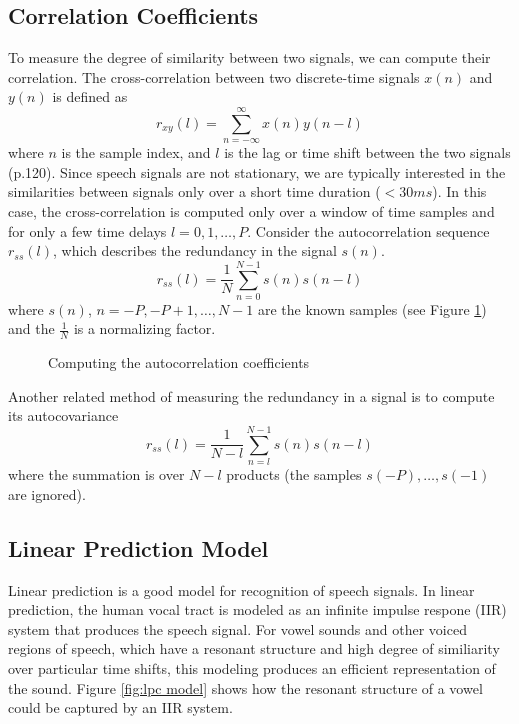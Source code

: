 %
%
%
%

\subsection{Correlation Coefficients}
To measure the degree of similarity between two signals, we can
compute their correlation.  The cross-correlation between two
discrete-time signals $x(n)$ and $y(n)$ is defined as
\begin{equation}
      r_{xy}(l) = \sum_{n=-\infty}^{\infty}x(n)y(n-l)
\end{equation}
where $n$ is the sample index, and $l$ is the lag or time
shift between the two signals \cite{Proakis} (p.120).  Since 
speech signals are not stationary, we are typically interested 
in the similarities between signals only over a short time 
duration ($<30ms$).  In this case, the cross-correlation 
is computed only over a window of time samples and for only 
a few time delays $l = 0,1,\dots,P$.  Consider the 
autocorrelation sequence $r_{ss}(l)$, which describes the 
redundancy in the signal $s(n)$.
\begin{equation}
      r_{ss}(l) = \frac{1}{N}\sum_{n=0}^{N-1}s(n)s(n-l)
\label{equ:autocorrelation}
\end{equation}
where $s(n)$, $n=-P,-P+1,\ldots,N-1$ are the known 
samples (see Figure \ref{fig:correlation}) and the $\frac{1}{N}$ is 
a normalizing factor.

\begin{figure}[htb]
   \begin{center}
      \vspace*{0.5cm}
      \caption{Computing the autocorrelation coefficients}
      \label{fig:correlation}
   \end{center}
\end{figure}

Another related method of measuring the redundancy in a signal is to 
compute its autocovariance
\begin{equation}
        r_{ss}(l) = \frac{1}{N-l}\sum_{n=l}^{N-1}s(n)s(n-l)
\label{equ:autocovariance}
\end{equation}
where the summation is over $N-l$ products (the samples 
$s(-P),\ldots,s(-1)$ are ignored).

\subsection{Linear Prediction Model}
Linear prediction is a good model for recognition of 
speech signals.  In linear prediction, the human vocal tract 
is modeled as an infinite impulse respone (IIR) system that produces 
the speech signal.  For vowel sounds and other voiced regions of speech, 
which have a resonant structure and high degree of similiarity over 
particular time shifts, this modeling produces an efficient 
representation of the sound.  Figure \ref{fig:lpc model} shows how the 
resonant structure of a vowel could be captured by an IIR system.

